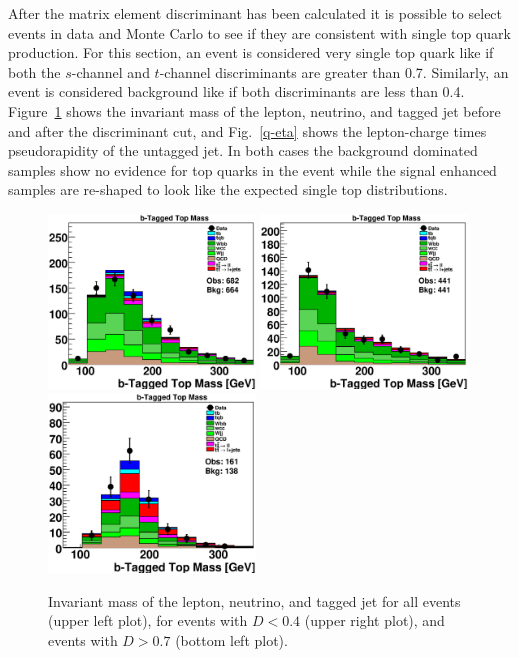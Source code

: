 \clearpage
After the matrix element discriminant has been calculated it is
possible to select events in data and
Monte Carlo to see if they are consistent with single top quark
production. For this section, an event is considered very single top
quark like if both the $s$-channel and $t$-channel discriminants are
greater than 0.7. Similarly, an event is considered background like if
both discriminants are less than 0.4. Figure~\ref{top-mass} shows the
invariant mass of the lepton, neutrino, and tagged jet before and
after the discriminant cut, and Fig.~\ref{q-eta} shows the
lepton-charge times pseudorapidity of the untagged jet. In both cases the background dominated samples show no evidence for top quarks in the event while the signal enhanced samples are re-shaped to look like the expected single top distributions.

\begin{figure}[!h!tbp]
\includegraphics[width=0.49\textwidth]
{eps/MatrixElement/topovars/BTaggedTopMass_0.eps}
\includegraphics[width=0.49\textwidth]
{eps/MatrixElement/topovars/BTaggedTopMass_-0.4.eps}
\includegraphics[width=0.49\textwidth]
{eps/MatrixElement/topovars/BTaggedTopMass_0.7.eps}
\vspace{-0.1in}
\caption{Invariant mass of the lepton, neutrino, and tagged
jet for all events (upper left plot), for events with $D < 0.4$ (upper right plot), and events with $D > 0.7$ (bottom left plot).}
\label{top-mass}
\end{figure}

